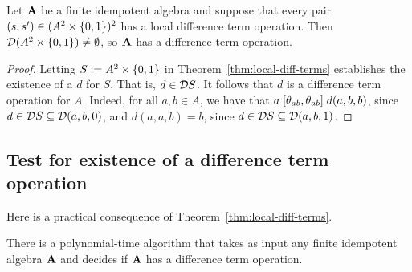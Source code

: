 \documentclass{ws-ijac}
\begin{document}
\begin{corollary}
  \label{cor:loc-diff-term}
  Let $\mathbf{A}$ be a finite idempotent algebra and suppose that
  every pair $(s, s') \in (A^2 \times \{0,1\})^2$ has a local difference term operation.
  Then $\mathcal{D} (A^2 \times \{0,1\}) \neq \emptyset$,
  so $\mathbf{A}$ has a difference term operation.
\end{corollary}
\begin{proof}
  Letting $S := A^2 \times \{0,1\}$ in Theorem~\ref{thm:local-diff-terms} establishes
  the existence of a \ldto $d$ for $S$.  That is, $d \in \mathcal{D} S$.
  It follows that $d$ is a difference
  term operation for $A$. Indeed, for all $a, b \in A$, we have that
  $a \mathrel{[\theta_{ab}, \theta_{ab}]} d(a,b,b)$, since $d \in \mathcal{D} S \subseteq \mathcal{D} (a,b,0)$,
  and $d(a,a,b) = b$, since $d\in \mathcal{D} S \subseteq \mathcal{D} (a,b,1)$.
\end{proof}
%
%


\subsection{Test for existence of a difference term operation}
\label{sec:algor-1}
Here is a practical consequence of Theorem~\ref{thm:local-diff-terms}.
\begin{corollary}
  \label{cor:algor-1}
  There is a polynomial-time algorithm that takes as input
  any finite idempotent algebra $\mathbf{A} $ and decides if
  $\mathbf{A} $ has a difference term operation.
\end{corollary}
\end{document}
